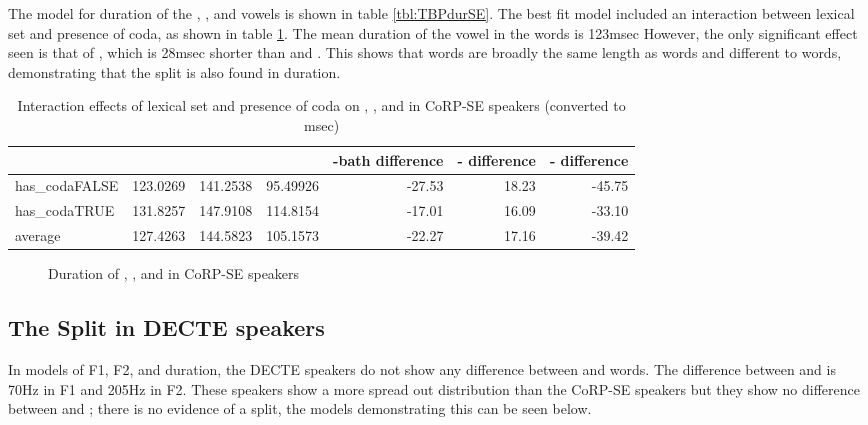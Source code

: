 \documentclass[../../../00.FullDoc/tex/ThesisSkeleton-draft2]{subfiles}
\begin{document}
%

The model for duration of the \trap{}, \bath{}, and \palm{} vowels is shown in table \ref{tbl:TBPdurSE}. The best fit model included an interaction between lexical set and presence of coda, as shown in table \ref{tbl:TBPdurSE-inter}. The mean duration of the vowel in the \bath{} words is 123msec However, the only significant effect seen is that of \trap{}, which is 28msec shorter than \palm{} and \bath{}. This shows that \bath{} words are broadly the same length as \palm{} words and different to \trap{} words, demonstrating that the \TB{} split is also found in duration.

\begin{table}[htbp]
	\centering
	\begin{tabular}{lrrrrrr}
		& \multicolumn{1}{l}{\bath{}} & \multicolumn{1}{l}{\palm{}} & \multicolumn{1}{l}{\trap{}} & \multicolumn{1}{l}{\trap{}-bath{} difference} & \multicolumn{1}{l}{\palm{}-\bath{} difference} & \multicolumn{1}{l}{\trap{}-\palm{} difference} \\
		\hline
		has\_codaFALSE & 123.0269 & 141.2538 & 95.49926 & -27.53 & 18.23 & -45.75 \\
		has\_codaTRUE & 131.8257 & 147.9108 & 114.8154 & -17.01 & 16.09 & -33.10 \\
		\hline
		average & 127.4263 & 144.5823 & 105.1573 & -22.27 & 17.16 & -39.42 \\
		\hline
	\end{tabular}%
	\caption{Interaction effects of lexical set and presence of coda on \trap{}, \bath{}, and \palm{} in CoRP-SE speakers (converted to msec)} 
	\label{tbl:TBPdurSE-inter}%
\end{table}%








\begin{figure}[h]
	
	\caption{Duration of \bath{}, \palm{}, and \trap{}  in CoRP-SE speakers} \label{fig:TBPdurSE}
\end{figure}


\subsection{The Split in DECTE speakers}
In models of F1, F2, and duration, the DECTE speakers do not show any difference between \trap{} and \bath{} words. The difference between \trap{} and \palm{} is 70Hz in F1 and 205Hz in F2. These speakers show a more spread out \palm{} distribution than the CoRP-SE speakers but they show no difference between \trap{} and \bath{}; there is no evidence of a \TB{} split, the models demonstrating this can be seen below.
\end{document}
